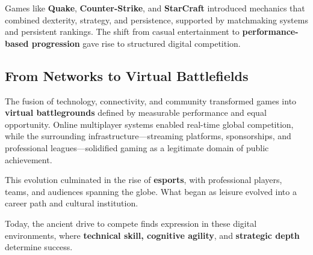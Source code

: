 Games like \textbf{Quake}, \textbf{Counter-Strike}, and \textbf{StarCraft} introduced mechanics that combined dexterity, strategy, and persistence, supported by matchmaking systems and persistent rankings. The shift from casual entertainment to \textbf{performance-based progression} gave rise to structured digital competition.

\subsection{From Networks to Virtual Battlefields}

The fusion of technology, connectivity, and community transformed games into \textbf{virtual battlegrounds} defined by measurable performance and equal opportunity. Online multiplayer systems enabled real-time global competition, while the surrounding infrastructure—streaming platforms, sponsorships, and professional leagues—solidified gaming as a legitimate domain of public achievement.

This evolution culminated in the rise of \textbf{esports}, with professional players, teams, and audiences spanning the globe. What began as leisure evolved into a career path and cultural institution.

Today, the ancient drive to compete finds expression in these digital environments, where \textbf{technical skill, cognitive agility}, and \textbf{strategic depth} determine success. 